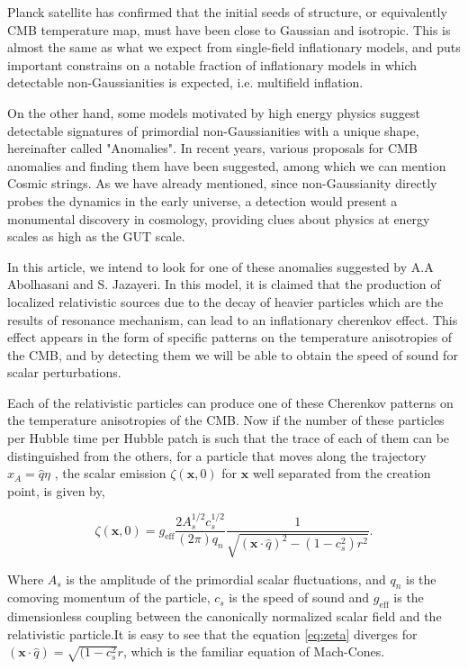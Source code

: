\documentclass[10pt, english, pra,aps,twocolumn,floatfix,superscriptaddress]{revtex4-2}
\begin{document}
Planck satellite has confirmed that the initial seeds of structure, or equivalently CMB temperature map, must have been close to Gaussian and isotropic\cite{Akrami_2020,isotropy}. This is almost the same as what we expect from single-field inflationary models\cite{single-field}, and puts important constrains on a notable fraction of inflationary models in which detectable non-Gaussianities is expected, i.e. multifield inflation\cite{NG-multifield,Planck_inflation}.

On the other hand, some models motivated by high energy physics suggest detectable signatures of primordial non-Gaussianities with a unique shape, hereinafter called "Anomalies"\cite{Anomaly}. In recent years, various proposals for CMB anomalies and finding them have been suggested, among which we can mention Cosmic strings\cite{CS,CS2}. As we have already mentioned, since non-Gaussianity directly probes the dynamics in the early universe, a detection would present a monumental discovery in cosmology, providing clues about physics at energy scales as high as the GUT scale\cite{PNG,meerburg2019primordial}.

In this article, we intend to look for one of these anomalies suggested by A.A Abolhasani and S. Jazayeri\cite{AAA}. In this model, it is claimed that the production of localized relativistic sources due to the decay of heavier particles which are the results of resonance mechanism, can lead to an inflationary cherenkov effect. This effect appears in the form of specific patterns on the temperature anisotropies of the CMB, and by detecting them we will be able to obtain the speed of sound for scalar perturbations.

Each of the relativistic particles can produce one of these Cherenkov patterns on the temperature anisotropies of the CMB. Now if the number of these particles per Hubble time per Hubble patch is such that the trace of each of them can be distinguished from the others, for a particle that moves along the trajectory $x_A = \hat{q}\eta$ , the scalar emission $\zeta(\boldsymbol{x}, 0)$ for $\boldsymbol{x}$ well separated from the creation point, is given by,

\begin{equation}
\label{eq:zeta}
\zeta(\boldsymbol{x}, 0)=g_{\mathrm{eff}} \frac{2 A_{s}^{1 / 2} c_{s}^{1 / 2}}{(2 \pi) q_{n}} \frac{1}{\sqrt{(\boldsymbol{x} \cdot \hat{q})^{2}-\left(1-c_{s}^{2}\right) r^{2}}}.
\end{equation}

Where $A_s$ is the amplitude of the primordial scalar fluctuations, and $q_{n}$ is the comoving momentum of the particle, $c_s$ is the speed of sound and $g_{\mathrm{eff}}$ is the dimensionless coupling between the canonically normalized scalar field and the relativistic particle.It is easy to see that the equation \ref{eq:zeta} diverges for $(\boldsymbol{x} \cdot \hat{q})=\sqrt{(1-c_{s}^{2}} r$, which is the familiar equation of Mach-Cones.
\end{document}
